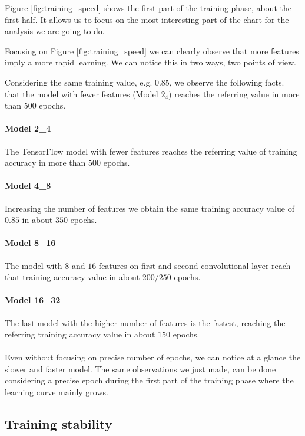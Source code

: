 Figure \ref{fig:training_speed} shows the first part of the training phase, about the first half. It allows us to focus on the most interesting part of the chart for the analysis we are going to do.

Focusing on Figure \ref{fig:training_speed} we can clearly observe that more features imply a more rapid learning. We can notice this in two ways, two points of view.

Considering the same training value, e.g. $0.85$, we observe the following facts. that the model with fewer features (Model $2_4$) reaches the referring value in more than $500$ epochs.

\paragraph{Model 2\_4}

The TensorFlow model with fewer features reaches the referring value of training accuracy in more than $500$ epochs.

\paragraph{Model 4\_8}

Increasing the number of features we obtain the same training accuracy value of $0.85$ in about $350$ epochs.

\paragraph{Model 8\_16}

The model with $8$ and $16$ features on first and second convolutional layer reach that training accuracy value in about $200/250$ epochs.

\paragraph{Model 16\_32}

The last model with the higher number of features is the fastest, reaching the referring training accuracy value in about $150$ epochs.
\\
\\
Even without focusing on precise number of epochs, we can notice at a glance the slower and faster model. The same observations we just made, can be done considering a precise epoch during the first part of the training phase where the learning curve mainly grows.

\subsection{Training stability}

